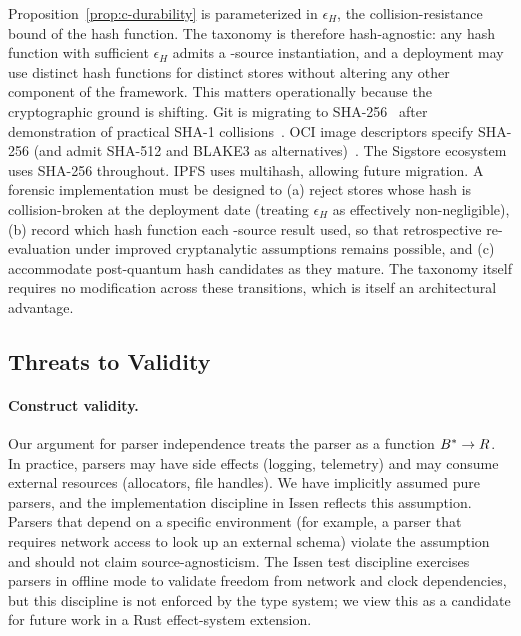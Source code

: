 Proposition~\ref{prop:c-durability} is parameterized in $\epsilon_H$, the
collision-resistance bound of the hash function. The taxonomy is therefore
hash-agnostic: any hash function with sufficient $\epsilon_H$ admits a
-source instantiation, and a deployment may use distinct hash
functions for distinct stores without altering any other component of the
framework. This matters operationally because the cryptographic ground is
shifting. Git is migrating to
SHA-256~\cite{git2020sha256} after demonstration of practical SHA-1
collisions~\cite{stevens2017sha1,leurent2020sha1chosen}. OCI image
descriptors specify SHA-256 (and admit SHA-512 and BLAKE3 as
alternatives)~\cite{ociimagespec_digest}. The Sigstore ecosystem uses
SHA-256 throughout. IPFS uses multihash, allowing future migration. A
forensic implementation must be designed to (a) reject  stores
whose hash is collision-broken at the deployment date (treating
$\epsilon_H$ as effectively non-negligible), (b) record which hash
function each -source result used, so that retrospective
re-evaluation under improved cryptanalytic assumptions remains possible,
and (c) accommodate post-quantum hash candidates as they mature. The
taxonomy itself requires no modification across these transitions, which
is itself an architectural advantage.

\subsection{Threats to Validity}

\paragraph{Construct validity.} Our argument for parser independence treats
the parser as a function $B^{*} \to R$. In practice, parsers may have
side effects (logging, telemetry) and may consume external resources
(allocators, file handles). We have implicitly assumed pure parsers, and
the implementation discipline in Issen reflects this assumption. Parsers
that depend on a specific environment (for example, a parser that requires
network access to look up an external schema) violate the assumption and
should not claim source-agnosticism. The Issen test discipline exercises
parsers in offline mode to validate freedom from network and clock
dependencies, but this discipline is not enforced by the type system; we
view this as a candidate for future work in a Rust effect-system
extension.

